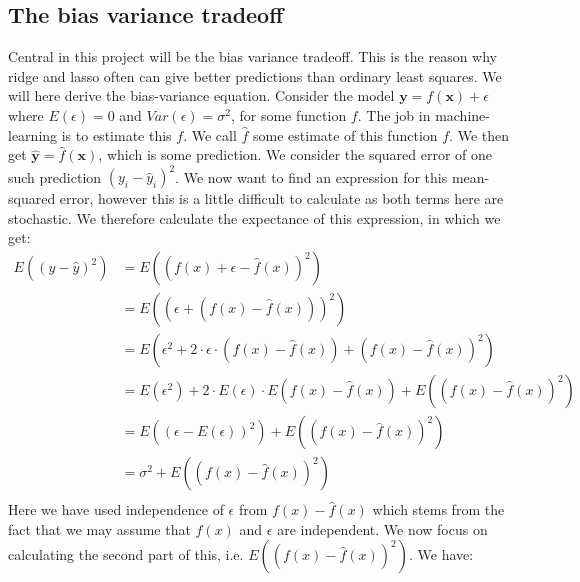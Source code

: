 \documentclass{article}
\begin{document}
\subsection{The bias variance tradeoff}
Central in this project will be the bias variance tradeoff. This is the reason
why ridge and lasso often can give better predictions than ordinary least
squares. We will here derive the bias-variance equation. Consider the model
$\mathbf{y} = f(\mathbf{x}) + \epsilon$ where $E(\epsilon) = 0$ and
$Var(\epsilon) = \sigma^2$, for some function $f$. The job in machine-learning
is to estimate this $f$. We call $\hat{f}$ some estimate of this function $f$.
We then get $\hat{\mathbf{y}} = \hat{f}(\mathbf{x})$, which is some prediction.
We consider the squared error of one such prediction $(y_i - \hat{y}_i)^2$. We
now want to find an expression for this mean-squared error, however this is a
little difficult to calculate as both terms here are stochastic. We therefore
calculate the expectance of this expression, in which we get:
\begin{align*}
    E((y - \hat{y})^2) & = E((f(x) + \epsilon - \hat{f}(x))^2)                                                      \\
                       & = E((\epsilon + (f(x) - \hat{f}(x)))^2)                                                    \\
                       & = E(\epsilon^2 + 2\cdot \epsilon \cdot (f(x) - \hat{f}(x)) + (f(x) - \hat{f}(x))^2)        \\
                       & = E(\epsilon^2) + 2\cdot E(\epsilon) \cdot E(f(x) - \hat{f}(x)) + E((f(x) - \hat{f}(x))^2) \\
                       & = E((\epsilon - E(\epsilon))^2) + E((f(x) - \hat{f}(x))^2)                                 \\
                       & = \sigma^2 + E((f(x) - \hat{f}(x))^2)                                                      \\
\end{align*}
Here we have used independence of $\epsilon$ from $f(x) - \hat{f}(x)$ which
stems from the fact that we may assume that $\hat{f}(x)$ and $\epsilon$ are
independent. We now focus on calculating the second part of this, i.e. $E((f(x)
    - \hat{f}(x))^2)$. We have:
\end{document}
